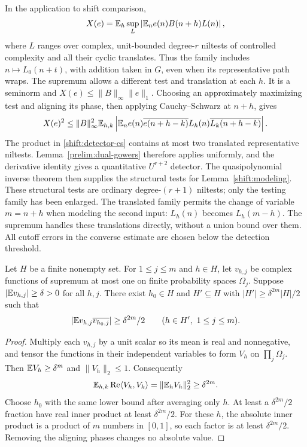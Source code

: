 In the application to shift comparison,
\begin{equation}\label{shift:testing-seminorm}
 X(e)=\mathbb E_h\sup_L
 \left|\mathbb E_ne(n)B(n+h)L(n)\right|,
\end{equation}
where $L$ ranges over complex, unit-bounded degree-$r$ niltests of
controlled complexity and all their cyclic translates.  Thus the
family includes $n\mapsto L_0(n+t)$, with addition taken in $G$,
even when its representative path wraps.  The supremum allows a
different test and translation at each $h$.  It is a seminorm and
$X(e)\leq\|B\|_\infty\|e\|_1$.
Choosing an approximately maximizing test and aligning its phase,
then applying Cauchy--Schwarz at $n+h$, gives
\begin{equation}\label{shift:detector-cs}
 X(e)^2\leq\|B\|_\infty^2
 \mathbb E_{h,k}\left|
 \mathbb E_n e(n)\overline{e(n+h-k)}
 L_h(n)\overline{L_k(n+h-k)}\right|.
\end{equation}
The product in \eqref{shift:detector-cs} contains at most two
translated representative niltests.  Lemma~\ref{prelim:dual-gowers}
therefore applies uniformly, and the derivative identity gives a
quantitative $U^{r+2}$ detector.
The quasipolynomial inverse theorem
\cite{LSSInverse2024} then supplies the structural tests for
Lemma~\ref{shift:modeling}.  These structural tests are ordinary
degree-$(r+1)$ niltests; only the testing family has been enlarged.
The translated family permits the change of variable $m=n+h$
when modeling the second input: $L_h(n)$ becomes $L_h(m-h)$.
The supremum handles these translations directly, without a union
bound over them.  All cutoff errors in the converse estimate are
chosen below the detection threshold.

\begin{lemma}\label{shift:anchor}
Let $H$ be a finite nonempty set.  For $1\leq j\leq m$ and
$h\in H$, let $v_{h,j}$ be complex functions of supremum at most
one on finite probability spaces $\Omega_j$.
Suppose $|\mathbb E v_{h,j}|\geq\delta>0$ for all $h,j$.
There exist $h_0\in H$ and $H'\subseteq H$ with
$|H'|\geq\delta^{2m}|H|/2$ such that
\[
 |\mathbb E v_{h,j}\overline{v_{h_0,j}}|
 \geq\delta^{2m}/2\qquad(h\in H',\ 1\leq j\leq m).
\]
\end{lemma}
\begin{proof}
Multiply each $v_{h,j}$ by a unit scalar so its mean is real
and nonnegative, and tensor the functions in their independent
variables to form $V_h$ on $\prod_j\Omega_j$.
Then $\mathbb E V_h\geq\delta^m$ and $\|V_h\|_2\leq1$.
Consequently
\[
 \mathbb E_{h,k}\operatorname{Re}\langle V_h,V_k\rangle
 =\|\mathbb E_hV_h\|_2^2\geq\delta^{2m}.
\]
Choose $h_0$ with the same lower bound after averaging only $h$.
At least a $\delta^{2m}/2$ fraction have real inner product at
least $\delta^{2m}/2$.  For these $h$, the absolute inner product
is a product of $m$ numbers in $[0,1]$, so each factor is at least
$\delta^{2m}/2$.  Removing the aligning phases changes no absolute
value.
\end{proof}

